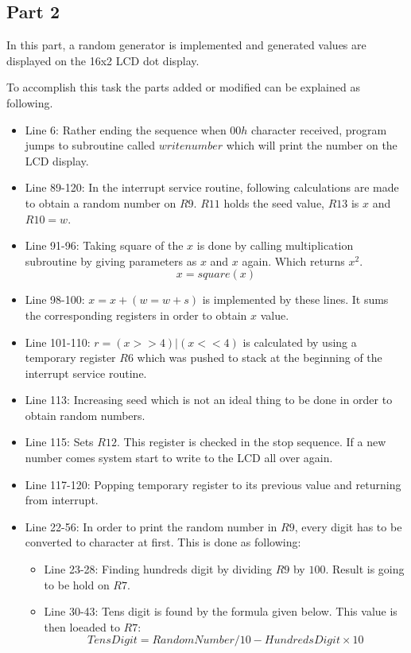 \documentclass[pdftex,12pt,a4paper]{article}
\begin{document}
\newpage
\subsection{Part 2}

In this part, a random generator is implemented and generated values are displayed on the 16x2 LCD dot display.

To accomplish this task the parts added or modified can be explained as following.

\begin{itemize}
    \item Line 6: Rather ending the sequence when $00h$ character received, program jumps to subroutine called $writenumber$ which will print the number on the LCD display.
    \item Line 89-120: In the interrupt service routine, following calculations are made to obtain a random number on $R9$. $R11$ holds the seed value, $R13$ is $x$ and $R10 = w$.
    \item Line 91-96: Taking square of the $x$ is done by calling multiplication subroutine by giving parameters as $x$ and $x$ again. Which returns $x^2$.
    \[x = square(x)\]
    \item Line 98-100: \(x = x +(w = w + s)\) is implemented by these lines. It sums the corresponding registers in order to obtain $x$ value.
    \item Line 101-110: \(r = (x>>4) | (x<<4)\) is calculated by using a temporary register $R6$ which was pushed to stack at the beginning of the interrupt service routine.
    \item Line 113: Increasing seed which is not an ideal thing to be done in order to obtain random numbers.
    \item Line 115: Sets $R12$. This register is checked in the stop sequence. If a new number comes system start to write to the LCD all over again.
    \item Line 117-120: Popping temporary register to its previous value and returning from interrupt.
    \item Line 22-56: In order to print the random number in $R9$, every digit has to be converted to character at first. This is done as following:
    \begin{itemize}
        \item Line 23-28: Finding hundreds digit by dividing $R9$
        by $100$. Result is going to be hold on $R7$.
        \item Line 30-43: Tens digit is found by the formula given below. This value is then loeaded to $R7$: \[TensDigit = RandomNumber / 10 - HundredsDigit \times 10\]

\end{itemize}
\end{itemize}
\end{document}
